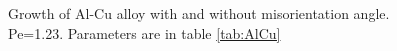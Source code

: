 \documentclass[a4paper,12pt]{article}
\begin{document}
\begin{figure}[!ht]
     \hfill
     \caption{Growth of Al-Cu alloy with and without misorientation angle. Pe=1.23. Parameters are in table \ref{tab:AlCu}}
     \label{fig:Ech}
   \end{figure}
   
\end{document}
